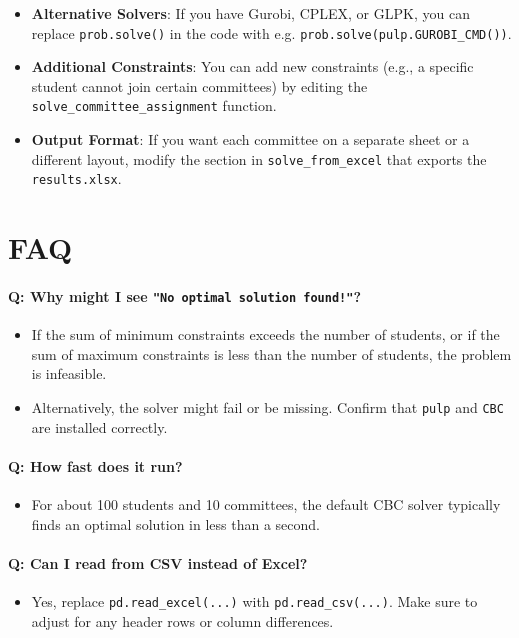 \documentclass[12pt]{article}
\begin{document}
\begin{itemize}
    \item \textbf{Alternative Solvers}:
          If you have Gurobi, CPLEX, or GLPK, you can replace
          \verb|prob.solve()| in the code with e.g. \verb|prob.solve(pulp.GUROBI_CMD())|.
    \item \textbf{Additional Constraints}:
          You can add new constraints (e.g., a specific student cannot join certain committees)
          by editing the \verb|solve_committee_assignment| function.
    \item \textbf{Output Format}:
          If you want each committee on a separate sheet or a different layout,
          modify the section in \verb|solve_from_excel| that exports the \verb|results.xlsx|.
\end{itemize}

\section{FAQ}

\paragraph{Q: Why might I see \texttt{"No optimal solution found!"}?}
\begin{itemize}
    \item If the sum of minimum constraints exceeds the number of students, or
          if the sum of maximum constraints is less than the number of students,
          the problem is infeasible.
    \item Alternatively, the solver might fail or be missing. Confirm that
          \texttt{pulp} and \texttt{CBC} are installed correctly.
\end{itemize}

\paragraph{Q: How fast does it run?}
\begin{itemize}
    \item For about 100 students and 10 committees, the default CBC solver
          typically finds an optimal solution in less than a second.
\end{itemize}

\paragraph{Q: Can I read from CSV instead of Excel?}
\begin{itemize}
    \item Yes, replace \verb|pd.read_excel(...)| with \verb|pd.read_csv(...)|.
          Make sure to adjust for any header rows or column differences.
\end{itemize}
\end{document}
